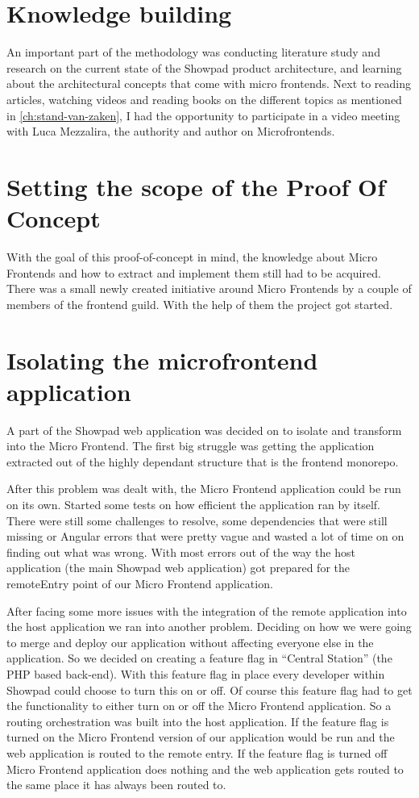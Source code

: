 \section{Knowledge building}
An important part of the methodology was conducting literature study and research on the current state of the Showpad product architecture, and learning about the architectural concepts that come with micro frontends. Next to reading articles, watching videos and reading books on the different topics as mentioned in \autoref{ch:stand-van-zaken}, I had the opportunity to participate in a video meeting with Luca Mezzalira, the authority and author on Microfrontends.
\section{Setting the scope of the Proof Of Concept}
With the goal of this proof-of-concept in mind, the knowledge about Micro Frontends and how to extract and implement them still had to be acquired. There was a small newly created initiative around Micro Frontends by a couple of members of the frontend guild. With the help of them the project got started. 
\section{Isolating the microfrontend application}
A part of the Showpad web application was decided on to isolate and transform into the Micro Frontend. The first big struggle was getting the application extracted out of the highly dependant structure that is the frontend monorepo.

After this problem was dealt with, the Micro Frontend application could be run on its own. Started some tests on how efficient the application ran by itself. There were still some challenges to resolve, some dependencies that were still missing or Angular errors that were pretty vague and wasted a lot of time on on finding out what was wrong. With most errors out of the way the host application (the main Showpad web application) got prepared for the remoteEntry point of our Micro Frontend application. 

After facing some more issues with the integration of the remote application into the host application we ran into another problem. Deciding on how we were going to merge and deploy our application without affecting everyone else in the application. So we decided on creating a feature flag in “Central Station” (the PHP based back-end). With this feature flag in place every developer within Showpad could choose to turn this on or off. Of course this feature flag had to get the functionality to either turn on or off the Micro Frontend application. So a routing orchestration was built into the host application. If the feature flag is turned on the Micro Frontend version of our application would be run and the web application is routed to the remote entry. If the feature flag is turned off Micro Frontend application does nothing and the web application gets routed to the same place it has always been routed to.
